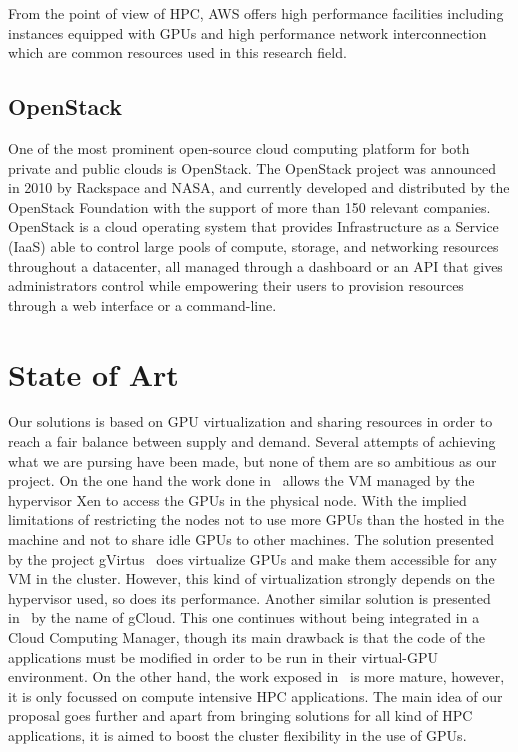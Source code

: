 \documentclass[a4paper,twoside]{article}
\begin{document}
From the point of view of HPC, AWS offers high performance facilities including 
instances equipped with GPUs and high performance network interconnection which 
are common resources used in this research field.

\subsection{OpenStack}
\label{sec:openstack}

One of the most prominent open-source cloud computing platform for both private and public clouds is OpenStack. The OpenStack project was announced in 2010 by Rackspace and NASA, and currently developed and distributed by the OpenStack Foundation with the support of more than 150 relevant companies. OpenStack is a cloud operating system that provides Infrastructure as a Service (IaaS) able to control large pools of compute, storage, and networking resources throughout a datacenter, all managed through a dashboard or an API that gives administrators control while empowering their users to provision resources through a web interface or a command-line. 


\section{State of Art}
\label{sec:state}
Our solutions
is based on GPU virtualization and sharing resources in order
to reach a fair balance between supply and demand.
Several attempts of achieving what we are pursing have been
made, but none of them are so ambitious as our project. On
the one hand the work done in~\cite{younge2013enabling} allows the VM managed
by the hypervisor Xen to access the GPUs in the physical
node. With the implied limitations of restricting the nodes not
to use more GPUs than the hosted in the machine and not
to share idle GPUs to other machines. The solution presented
by the project gVirtus~\cite{giunta2010gpgpu} does virtualize GPUs and make
them accessible for any VM in the cluster. However, this kind
of virtualization strongly depends on the hypervisor used, so
does its performance. Another similar solution is presented in~\cite{diab2013dynamic} by the name of gCloud. This one continues without being
integrated in a Cloud Computing Manager, though its main
drawback is that the code of the applications must be modified
in order to be run in their virtual-GPU environment. On the
other hand, the work exposed in~\cite{jungpgpu} is more mature, however,
it is only focussed on compute intensive HPC applications.
The main idea of our proposal goes further and apart from
bringing solutions for all kind of HPC applications, it is aimed
to boost the cluster flexibility in the use of GPUs.
\end{document}
